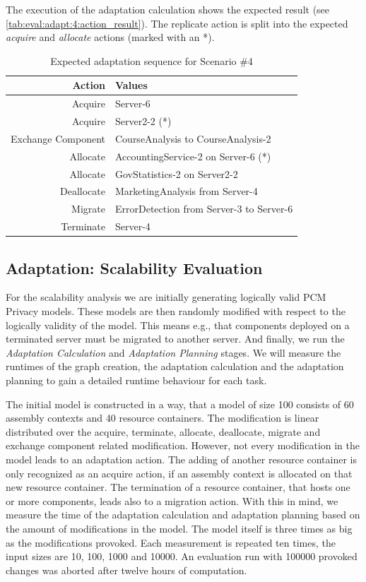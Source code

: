 The execution of the adaptation calculation shows the expected result (see \autoref{tab:eval:adapt:4:action_result}). The replicate action is split into the expected \textit{acquire} and \textit{allocate} actions (marked with an *).

\begin{table}[h]
	\centering
	\begin{tabular}{r | l }
		\hline
		\textbf{Action} & \textbf{Values}\\
		\hline
		Acquire & Server-6\\
		Acquire & Server2-2 (*)\\
		Exchange Component & CourseAnalysis to CourseAnalysis-2\\
		Allocate & AccountingService-2 on Server-6 (*)\\
		Allocate & GovStatistics-2 on Server2-2\\
		Deallocate & MarketingAnalysis from Server-4\\
		Migrate & ErrorDetection from Server-3 to Server-6\\
		Terminate & Server-4\\
		\hline
	\end{tabular}
	\caption{Expected adaptation sequence for Scenario \#4}
	\label{tab:eval:adapt:4:action_result}
\end{table}



\subsection{Adaptation: Scalability Evaluation}

For the scalability analysis we are initially generating logically valid PCM Privacy models. These models are then randomly modified with respect to the logically validity of the model. This means e.g., that components deployed on a terminated server must be migrated to another server. And finally, we run the \textit{Adaptation Calculation} and \textit{Adaptation Planning} stages. We will measure the runtimes of the graph creation, the adaptation calculation and the adaptation planning to gain a detailed runtime behaviour for each task.

The initial model is constructed in a way, that a model of size 100 consists of 60 assembly contexts and 40 resource containers. The modification is linear distributed over the acquire, terminate, allocate, deallocate, migrate and exchange component related modification. However, not every modification in the model leads to an adaptation action. The adding of another resource container is only recognized as an acquire action, if an assembly context is allocated on that new resource container. The termination of a resource container, that hosts one or more components, leads also to a migration action. With this in mind, we measure the time of the adaptation calculation and adaptation planning based on the amount of modifications in the model. The model itself is three times as big as the modifications provoked. Each measurement is repeated ten times, the input sizes are 10, 100, 1000 and 10000. An evaluation run with 100000 provoked changes was aborted after twelve hours of computation.


